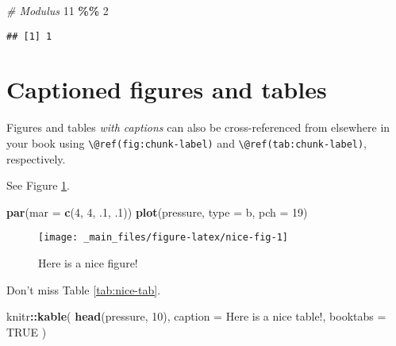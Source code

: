 \documentclass[
]{book}
\newenvironment{Shaded}{\begin{snugshade}}{\end{snugshade}}
\newcommand{\AttributeTok}[1]{\textcolor[rgb]{0.13,0.29,0.53}{#1}}
\newcommand{\CommentTok}[1]{\textcolor[rgb]{0.56,0.35,0.01}{\textit{#1}}}
\newcommand{\ConstantTok}[1]{\textcolor[rgb]{0.56,0.35,0.01}{#1}}
\newcommand{\DecValTok}[1]{\textcolor[rgb]{0.00,0.00,0.81}{#1}}
\newcommand{\FunctionTok}[1]{\textcolor[rgb]{0.13,0.29,0.53}{\textbf{#1}}}
\newcommand{\NormalTok}[1]{#1}
\newcommand{\SpecialCharTok}[1]{\textcolor[rgb]{0.81,0.36,0.00}{\textbf{#1}}}
\newcommand{\StringTok}[1]{\textcolor[rgb]{0.31,0.60,0.02}{#1}}
\theoremstyle{definition}
\theoremstyle{definition}
\theoremstyle{definition}
\theoremstyle{definition}
\theoremstyle{remark}
\begin{document}
\begin{Shaded}
\begin{Highlighting}[]
\CommentTok{\# Modulus}
\DecValTok{11} \SpecialCharTok{\%\%} \DecValTok{2}
\end{Highlighting}
\end{Shaded}

\begin{verbatim}
## [1] 1
\end{verbatim}

\hypertarget{captioned-figures-and-tables}{%
\section{Captioned figures and tables}\label{captioned-figures-and-tables}}

Figures and tables \emph{with captions} can also be cross-referenced from elsewhere in your book using \texttt{\textbackslash{}@ref(fig:chunk-label)} and \texttt{\textbackslash{}@ref(tab:chunk-label)}, respectively.

See Figure \ref{fig:nice-fig}.

\begin{Shaded}
\begin{Highlighting}[]
\FunctionTok{par}\NormalTok{(}\AttributeTok{mar =} \FunctionTok{c}\NormalTok{(}\DecValTok{4}\NormalTok{, }\DecValTok{4}\NormalTok{, .}\DecValTok{1}\NormalTok{, .}\DecValTok{1}\NormalTok{))}
\FunctionTok{plot}\NormalTok{(pressure, }\AttributeTok{type =} \StringTok{\textquotesingle{}b\textquotesingle{}}\NormalTok{, }\AttributeTok{pch =} \DecValTok{19}\NormalTok{)}
\end{Highlighting}
\end{Shaded}

\begin{figure}

{\centering \texttt{[image: \_main\_files/figure-latex/nice-fig-1]} 

}

\caption{Here is a nice figure!}\label{fig:nice-fig}
\end{figure}

Don't miss Table \ref{tab:nice-tab}.

\begin{Shaded}
\begin{Highlighting}[]
\NormalTok{knitr}\SpecialCharTok{::}\FunctionTok{kable}\NormalTok{(}
  \FunctionTok{head}\NormalTok{(pressure, }\DecValTok{10}\NormalTok{), }\AttributeTok{caption =} \StringTok{\textquotesingle{}Here is a nice table!\textquotesingle{}}\NormalTok{,}
  \AttributeTok{booktabs =} \ConstantTok{TRUE}
\NormalTok{)}
\end{Highlighting}
\end{Shaded}
\end{document}
